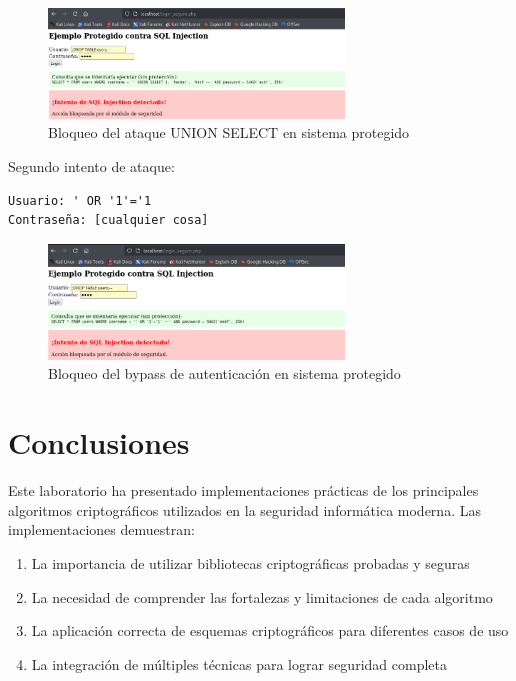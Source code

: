 \documentclass[12pt,a4paper]{article}
\begin{document}
\begin{figure}[H]
	\centering
	\includegraphics[width=0.7\textwidth]{./assets/img12.png}
	\caption{Bloqueo del ataque UNION SELECT en sistema protegido}
	\label{fig:proteccion-union}
\end{figure}

Segundo intento de ataque:

\begin{lstlisting}[caption=Intento de bypass en sistema protegido]
Usuario: ' OR '1'='1
Contraseña: [cualquier cosa]
\end{lstlisting}

\begin{figure}[H]
	\centering
	\includegraphics[width=0.7\textwidth]{./assets/img13.png}
	\caption{Bloqueo del bypass de autenticación en sistema protegido}
	\label{fig:proteccion-bypass}
\end{figure}


\section{Conclusiones}

Este laboratorio ha presentado implementaciones prácticas de los principales
algoritmos criptográficos utilizados en la seguridad informática moderna. Las
implementaciones demuestran:

\begin{enumerate}
	\item La importancia de utilizar bibliotecas criptográficas probadas y seguras
	\item La necesidad de comprender las fortalezas y limitaciones de cada algoritmo
	\item La aplicación correcta de esquemas criptográficos para diferentes casos de uso
	\item La integración de múltiples técnicas para lograr seguridad completa
\end{enumerate}
\end{document}
